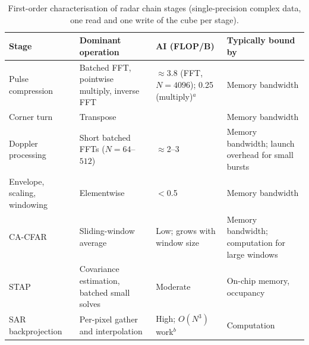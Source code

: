 \begin{table}[t]
      \caption{First-order characterisation of radar chain stages
            (single-precision complex data, one read and one write of the cube per stage).}
      \label{tab:workload}
      \centering
      \footnotesize
      \begin{tabularx}{\columnwidth}{@{}
            >{\raggedright\arraybackslash}p{1.45cm}
            >{\raggedright\arraybackslash}X
            >{\raggedright\arraybackslash}p{1.45cm}
            >{\raggedright\arraybackslash}X@{}}
            \toprule
            Stage & Dominant operation                                                                               & AI (FLOP/B) & Typically bound by \\
            \midrule
            Pulse compression
                  & Batched FFT, pointwise multiply, inverse FFT
                  & $\approx$3.8 (FFT, $N{=}4096$); 0.25 (multiply)$^{a}$
                  & Memory bandwidth \cite{venterSOFTWAREDEFINEDPULSEDOPPLERRADAR}                                                                      \\
            Corner turn
                  & Transpose
                  & 0
                  & Memory bandwidth \cite{venterSOFTWAREDEFINEDPULSEDOPPLERRADAR}                                                                      \\
            Doppler processing
                  & Short batched FFTs ($N{=}64$--$512$)
                  & $\approx$2--3
                  & Memory bandwidth; launch overhead for small bursts \cite{venterSOFTWAREDEFINEDPULSEDOPPLERRADAR}                                    \\
            Envelope, scaling, windowing
                  & Elementwise
                  & $<$0.5
                  & Memory bandwidth \cite{venterSOFTWAREDEFINEDPULSEDOPPLERRADAR,denhamWeatherRadarData2018a}                                          \\
            CA-CFAR
                  & Sliding-window average
                  & Low; grows with window size
                  & Memory bandwidth; computation for large windows
            \cite{venterSOFTWAREDEFINEDPULSEDOPPLERRADAR,yangGPUOrientedDesignsConstant2022a}                                                           \\
            STAP
                  & Covariance estimation, batched small solves
                  & Moderate
                  & On-chip memory, occupancy
            \cite{bensonGPUbasedSpacetimeAdaptive2013a,gawandePowerPerformanceTradeoffs2015a}                                                           \\
            SAR backprojection
                  & Per-pixel gather and interpolation
                  & High; $O(N^3)$ work$^{b}$
                  & Computation
            \cite{leeArchitectureExplorationBackprojection2021a,parkEfficientBackprojectionbasedSynthetic2012}                                          \\
            \bottomrule
      \end{tabularx}


\end{table}
